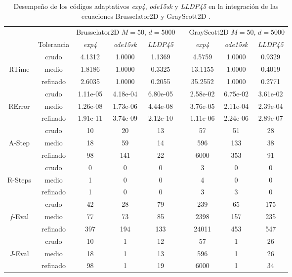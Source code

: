 \begin{table}[htb]
	\caption{Desempeño de los códigos adaptativos  \emph{exp4}, \emph{ode15sk} y \emph{LLDP45} en la integración de las ecuaciones Brusselator2D y GrayScott2D .}	\label{tab:num-exp-lldp-var-step:bruss2dgray2d}
	\begin{adjustbox}{width=0.8\columnwidth,center}
	\begin{tabular}{  ccccccccc }
		\hline
		& & \multicolumn{3}{c}{Brusselator2D $M=50$, $d=5000$ } & & \multicolumn{3}{c}{GrayScott2D $M=50$, $d=5000$ }\\
		\cline{3-5} \cline{7-9}
		& Tolerancia & \emph{exp4} & \emph{ode15sk} & \emph{LLDP45} & & \emph{exp4} & \emph{ode15sk} & \emph{LLDP45} \\
		\hline
		& crudo & 4.1312 & 1.0000 & 1.1369 &  & 4.5759 & 1.0000 & 0.9329 \\
		RTime  & medio & 1.8186 & 1.0000 & 0.3325 &  & 13.1155 & 1.0000 & 0.4019 \\
		& refinado & 2.6035 & 1.0000 & 0.2055  & & 35.2552 & 1.0000 & 0.2771 \\
		\hline
		& crudo & 1.11e-05 & 4.18e-04 & 6.80e-05 & &  2.58e-02 & 6.75e-02 & 3.61e-02 \\
		RError  & medio & 1.26e-08 & 1.73e-06 & 4.44e-08 & &  3.76e-05 & 2.11e-04 & 2.39e-04 \\
		& refinado & 1.91e-11 & 3.74e-09 & 2.12e-10 & &  1.11e-06 & 2.24e-06 & 2.89e-07 \\
		\hline
		& crudo & 10 & 20 & 13 &  & 57 & 51 & 28 \\
		A-Step  & medio & 18 & 59 & 14 & &  596 & 133 & 38 \\
		& refinado & 98 & 141 & 22 & &  6000 & 353 & 91 \\
		\hline
		& crudo & 0 & 0 & 0  & & 3 & 0 & 0 \\
		R-Steps  & medio & 1 & 0 & 0  & & 4 & 0 & 0 \\
		& refinado & 1 & 0 & 0  & & 3 & 3 & 0 \\
		\hline
		& crudo & 42 & 28 & 79  & & 239 & 65 & 175 \\
		$f$-Eval  & medio & 77 & 73 & 85  & & 2398 & 157 & 235 \\
		& refinado & 397 & 194 & 133  & & 24011 & 453 & 547 \\
		\hline
		& crudo & 10 & 1 & 12 & &  57 & 1 & 26 \\
		$J$-Eval  & medio & 18 & 1 & 13  & & 596 & 1 & 26 \\
		& refinado & 98 & 1 & 19 & &  6000 & 1 & 34 \\

\end{tabular}
\end{adjustbox}
\end{table}
